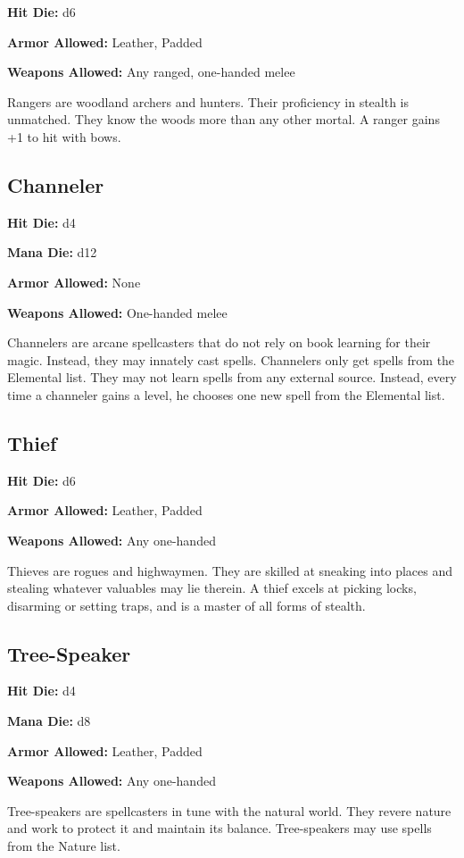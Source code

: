 \begin{multicols}{2}
\textbf{Hit Die:} d6

\textbf{Armor Allowed:} Leather, Padded

\textbf{Weapons Allowed:} Any ranged, one-handed melee

Rangers are woodland archers and hunters. Their proficiency in stealth is
unmatched. They know the woods more than any other mortal. A ranger gains +1 to
hit with bows.

\subsection{Channeler}

\textbf{Hit Die:} d4

\textbf{Mana Die:} d12

\textbf{Armor Allowed:} None

\textbf{Weapons Allowed:} One-handed melee

Channelers are arcane spellcasters that do not rely on book learning for their
magic. Instead, they may innately cast spells. Channelers only get spells from
the Elemental list. They may not learn spells from any external source. Instead,
every time a channeler gains a level, he chooses one new spell from the Elemental
list.

\subsection{Thief}

\textbf{Hit Die:} d6

\textbf{Armor Allowed:} Leather, Padded

\textbf{Weapons Allowed:} Any one-handed

Thieves are rogues and highwaymen. They are skilled at sneaking into places and
stealing whatever valuables may lie therein. A thief excels at picking locks,
disarming or setting traps, and is a master of all forms of stealth.

\subsection{Tree-Speaker}

\textbf{Hit Die:} d4

\textbf{Mana Die:} d8

\textbf{Armor Allowed:} Leather, Padded

\textbf{Weapons Allowed:} Any one-handed

Tree-speakers are spellcasters in tune with the natural world. They revere nature
and work to protect it and maintain its balance. Tree-speakers may use spells from
the Nature list.


\end{multicols}
